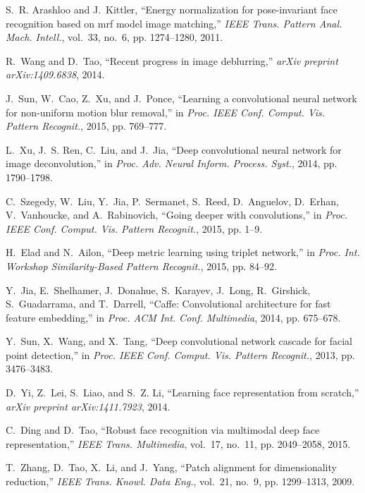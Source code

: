 \documentclass[10pt,journal,cspaper,compsoc]{IEEEtran}
\begin{document}
\begin{thebibliography}{10}
S.~R. Arashloo and J.~Kittler, ``Energy normalization for pose-invariant face
  recognition based on mrf model image matching,'' \emph{IEEE Trans. Pattern
  Anal. Mach. Intell.}, vol.~33, no.~6, pp. 1274--1280, 2011.

R.~Wang and D.~Tao, ``Recent progress in image deblurring,'' \emph{arXiv
  preprint arXiv:1409.6838}, 2014.

J.~Sun, W.~Cao, Z.~Xu, and J.~Ponce, ``Learning a convolutional neural network
  for non-uniform motion blur removal,'' in \emph{Proc. IEEE Conf. Comput. Vis.
  Pattern Recognit.}, 2015, pp. 769--777.

L.~Xu, J.~S. Ren, C.~Liu, and J.~Jia, ``Deep convolutional neural network for
  image deconvolution,'' in \emph{Proc. Adv. Neural Inform. Process. Syst.},
  2014, pp. 1790--1798.

C.~Szegedy, W.~Liu, Y.~Jia, P.~Sermanet, S.~Reed, D.~Anguelov, D.~Erhan,
  V.~Vanhoucke, and A.~Rabinovich, ``Going deeper with convolutions,'' in
  \emph{Proc. IEEE Conf. Comput. Vis. Pattern Recognit.}, 2015, pp. 1--9.

H.~Elad and N.~Ailon, ``Deep metric learning using triplet network,'' in
  \emph{Proc. Int. Workshop Similarity-Based Pattern Recognit.}, 2015, pp.
  84--92.

Y.~Jia, E.~Shelhamer, J.~Donahue, S.~Karayev, J.~Long, R.~Girshick,
  S.~Guadarrama, and T.~Darrell, ``Caffe: Convolutional architecture for fast
  feature embedding,'' in \emph{Proc. ACM Int. Conf. Multimedia}, 2014, pp.
  675--678.

Y.~Sun, X.~Wang, and X.~Tang, ``Deep convolutional network cascade for facial
  point detection,'' in \emph{Proc. IEEE Conf. Comput. Vis. Pattern Recognit.},
  2013, pp. 3476--3483.

D.~Yi, Z.~Lei, S.~Liao, and S.~Z. Li, ``Learning face representation from
  scratch,'' \emph{arXiv preprint arXiv:1411.7923}, 2014.

C.~Ding and D.~Tao, ``Robust face recognition via multimodal deep face
  representation,'' \emph{IEEE Trans. Multimedia}, vol.~17, no.~11, pp.
  2049--2058, 2015.

T.~Zhang, D.~Tao, X.~Li, and J.~Yang, ``Patch alignment for dimensionality
  reduction,'' \emph{IEEE Trans. Knowl. Data Eng.}, vol.~21, no.~9, pp.
  1299--1313, 2009.


\end{thebibliography}
\end{document}

